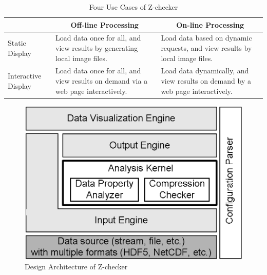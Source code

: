 \begin{table}[ht] \centering
\caption{Four Use Cases of Z-checker} \centering
\scriptsize
\begin{tabular}{|l|p{}|p{}|}
\hline \multicolumn{1}{|c|}{} & \multicolumn{1}{|c|}{Off-line Processing}&\multicolumn{1}{|c|}{On-line Processing}\\
\hline
Static Display & Load data once for all, and view results by generating local image files. & Load data based on dynamic requests, and view results by  local image files.\\
\hline
Interactive Display & Load data once for all, and view results on demand via a web page interactively. & Load data dynamically, and view results on demand by a web page interactively. \\
\hline
\end{tabular}
\label{tab:modes}
\end{table}

 \begin{figure}[ht] \centering
\includegraphics[scale=.6]{Figs/framework.eps}
\caption{Design Architecture of Z-checker}
\label{fig:framework}
\end{figure}

